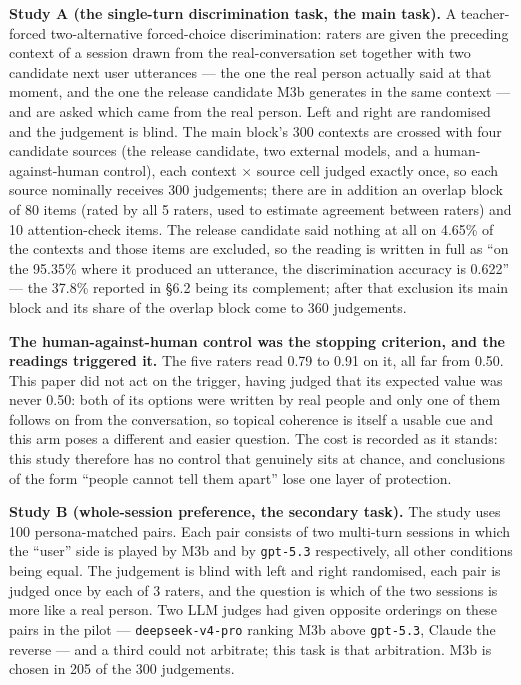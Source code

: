 \documentclass[letterpaper]{article}
\begin{document}
\textbf{Study A (the single-turn discrimination task, the main task).} A teacher-forced two-alternative forced-choice discrimination: raters are given the preceding context of a session drawn from the real-conversation set together with two candidate next user utterances --- the one the real person actually said at that moment, and the one the release candidate M3b generates in the same context --- and are asked which came from the real person. Left and right are randomised and the judgement is blind. The main block's 300 contexts are crossed with four candidate sources (the release candidate, two external models, and a human-against-human control), each context $\times$ source cell judged exactly once, so each source nominally receives 300 judgements; there are in addition an overlap block of 80 items (rated by all 5 raters, used to estimate agreement between raters) and 10 attention-check items. The release candidate said nothing at all on 4.65\% of the contexts and those items are excluded, so the reading is written in full as ``on the 95.35\% where it produced an utterance, the discrimination accuracy is 0.622'' --- the 37.8\% reported in \S{}6.2 being its complement; after that exclusion its main block and its share of the overlap block come to 360 judgements.

\textbf{The human-against-human control was the stopping criterion, and the readings triggered it.} The five raters read 0.79 to 0.91 on it, all far from 0.50. This paper did not act on the trigger, having judged that its expected value was never 0.50: both of its options were written by real people and only one of them follows on from the conversation, so topical coherence is itself a usable cue and this arm poses a different and easier question. The cost is recorded as it stands: this study therefore has no control that genuinely sits at chance, and conclusions of the form ``people cannot tell them apart'' lose one layer of protection.

\textbf{Study B (whole-session preference, the secondary task).} The study uses 100 persona-matched pairs. Each pair consists of two multi-turn sessions in which the ``user'' side is played by M3b and by \texttt{gpt-5.3} respectively, all other conditions being equal. The judgement is blind with left and right randomised, each pair is judged once by each of 3 raters, and the question is which of the two sessions is more like a real person. Two LLM judges had given opposite orderings on these pairs in the pilot --- \texttt{deepseek-v4-pro} ranking M3b above \texttt{gpt-5.3}, Claude the reverse --- and a third could not arbitrate; this task is that arbitration. M3b is chosen in 205 of the 300 judgements.
\end{document}
